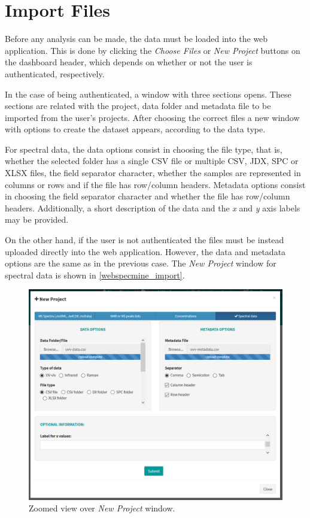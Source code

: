 \section{Import Files} \label{import_files}

Before any analysis can be made, the data must be loaded into the web application. This is done by clicking the \textit{Choose Files} or \textit{New Project} buttons on the dashboard header, which depends on whether or not the user is authenticated, respectively.

In the case of being authenticated, a window with three sections opens. These sections are related with the project, data folder and metadata file to be imported from the user's projects. After choosing the correct files a new window with options to create the dataset appears, according to the data type. 

For spectral data, the data options consist in choosing the file type, that is, whether the selected folder has a single CSV file or multiple CSV, JDX, SPC or XLSX files, the field separator character, whether the samples are represented in columns or rows and if the file has row/column headers. Metadata options consist in choosing the field separator character and whether the file has row/column headers. Additionally, a short description of the data and the \textit{x} and \textit{y} axis labels may be provided. 

On the other hand, if the user is not authenticated the files must be instead uploaded directly into the web application. However, the data and metadata options are the same as in the previous case. The \textit{New Project} window for spectral data is shown in \autoref{webspecmine_import}.

\begin{figure}[h]
	\centering
	\includegraphics[width=0.8\linewidth]{Imagens/webspecmine_import}
	\caption{Zoomed view over \textit{New Project} window.}
	\label{webspecmine_import}
\end{figure}

